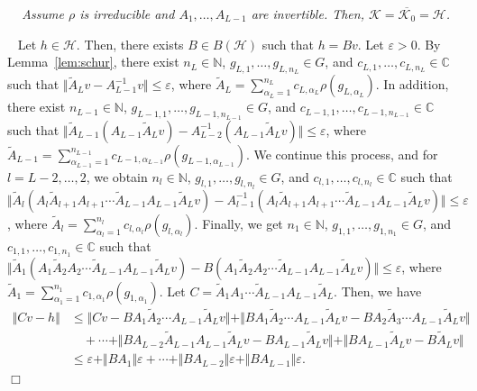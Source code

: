 \documentclass[twoside]{article}
\newenvironment{proof}[1][Proof\ ]{\medskip\noindent{\bf #1}\ }{%
\hfill $\Box$\par\quad\par}
\def\mcl#1{\mathcal{#1}}
\def\hil{\mcl{H}}
\newenvironment{mythm}[1][]{\medskip\par\noindent{\bfseries #1}\ \,\,\em}{\medskip\par}
\begin{document}
\begin{mythm}[Lemma~\ref{lem:dense}]
Assume $\rho$ is irreducible and $A_1,\ldots, A_{L-1}$ are invertible.
Then, $\mcl{K}=\overline{\mcl{K}_0}=\hil$.    
\end{mythm}
\begin{proof}
Let $h\in\hil$. 
Then, there exists $B\in B(\hil)$ such that $h=Bv$. 
Let $\varepsilon>0$.
By Lemma~\ref{lem:schur}, there exist $n_L\in\mathbb{N}$, $g_{L,1},\ldots,g_{L,n_L}\in G$, and $c_{L,1},\ldots,c_{L,n_L}\in\mathbb{C}$ such that $\Vert \tilde{A}_Lv-A_{L-1}^{-1}v\Vert\le \varepsilon$, where $\tilde{A}_L=\sum_{\alpha_L=1}^{n_L}c_{L,\alpha_L}\rho(g_{L,\alpha_L})$.
In addition, there exist $n_{L-1}\in\mathbb{N}$, $g_{L-1,1},\ldots,g_{L-1,n_{L-1}}\in G$, and $c_{L-1,1},\ldots,c_{L-1,n_{L-1}}\in\mathbb{C}$ such that $\Vert \tilde{A}_{L-1}(A_{L-1}\tilde{A}_Lv)-A_{L-2}^{-1}(A_{L-1}\tilde{A}_Lv)\Vert\le \varepsilon$, where $\tilde{A}_{L-1}=\sum_{\alpha_{L-1}=1}^{n_{L-1}}c_{L-1,\alpha_{L-1}}\rho(g_{{L-1},\alpha_{L-1}})$.
We continue this process, and for $l=L-2,\ldots,2$, we obtain $n_l\in\mathbb{N}$, $g_{l,1},\ldots,g_{l,n_l}\in G$, and $c_{l,1},\ldots,c_{l,n_l}\in\mathbb{C}$ such that $\Vert \tilde{A}_{l}(A_{l}\tilde{A}_{l+1}A_{l+1}\cdots \tilde{A}_{L-1}A_{L-1}\tilde{A}_Lv)-A_{l-1}^{-1}(A_{l}\tilde{A}_{l+1}A_{l+1}\cdots \tilde{A}_{L-1}A_{L-1}\tilde{A}_Lv)\Vert\le \varepsilon$, where $\tilde{A}_{l}=\sum_{\alpha_{l}=1}^{n_{l}}c_{l,\alpha_{l}}\rho(g_{{l},\alpha_{l}})$.
Finally, we get $n_1\in\mathbb{N}$, $g_{1,1},\ldots,g_{1,n_1}\in G$, and $c_{1,1},\ldots,c_{1,n_1}\in\mathbb{C}$ such that $\Vert \tilde{A}_{1}(A_{1}\tilde{A}_{2}A_{2}\cdots \tilde{A}_{L-1}A_{L-1}\tilde{A}_Lv)-B(A_{1}\tilde{A}_{2}A_{2}\cdots \tilde{A}_{L-1}A_{L-1}\tilde{A}_Lv)\Vert\le \varepsilon$, where $\tilde{A}_{1}=\sum_{\alpha_{1}=1}^{n_{1}}c_{1,\alpha_{1}}\rho(g_{{1},\alpha_{1}})$.
Let $C=\tilde{A}_1A_1\cdots \tilde{A}_{L-1}A_{L-1}\tilde{A}_L$.
Then, we have
\begin{align*}
\Vert Cv - h\Vert &\le  \Vert C v - BA_1\tilde{A}_2 \cdots A_{L-1}\tilde{A}_Lv\Vert + \Vert B A_1 \tilde{A}_2\cdots A_{L-1}\tilde{A}_Lv - BA_2 \tilde{A}_3\cdots A_{L-1}\tilde{A}_Lv\Vert \\
&\quad +\cdots +\Vert B A_{L-2} \tilde{A}_{L-1}A_{L-1}\tilde{A}_Lv - BA_{L-1} \tilde{A}_Lv\Vert  + \Vert BA_{L-1}\tilde{A}_Lv - B\tilde{A}_{L}v\Vert\\
&\le \varepsilon + \Vert B A_1\Vert\varepsilon +\cdots +\Vert BA_{L-2}\Vert \varepsilon+\Vert BA_{L-1}\Vert \varepsilon. 
\end{align*}
\end{proof}
\end{document}
